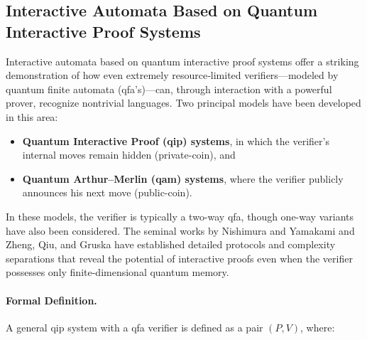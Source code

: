 \subsection{Interactive Automata Based on Quantum Interactive Proof Systems}
\label{sec:interactive-automata}

Interactive automata based on quantum interactive proof systems offer a striking demonstration of how even extremely resource‐limited verifiers—modeled by quantum finite automata (qfa’s)—can, through interaction with a powerful prover, recognize nontrivial languages. Two principal models have been developed in this area:
  
\begin{itemize}
  \item \textbf{Quantum Interactive Proof (\gls{qip}) systems}, in which the verifier’s internal moves remain hidden (private-coin), and
  \item \textbf{Quantum Arthur–Merlin (\gls{qam}) systems}, where the verifier publicly announces his next move (public-coin).
\end{itemize}

In these models, the verifier is typically a two-way qfa, though one-way variants have also been considered. The seminal works by Nishimura and Yamakami \cite{nishimura2009application, nishimura2015interactive} and Zheng, Qiu, and Gruska \cite{zheng2015power} have established detailed protocols and complexity separations that reveal the potential of interactive proofs even when the verifier possesses only finite-dimensional quantum memory.

\paragraph{Formal Definition.}
A general \gls{qip} system with a qfa verifier is defined as a pair $(P,V)$, where:

